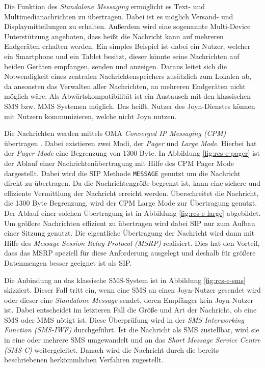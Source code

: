 \documentclass[german,12pt,a4paper]{article}
\begin{document}
    Die Funktion des \textit{Standalone Messaging} ermöglicht es Text- und Multimedianachrichten
    zu übertragen. Dabei ist es möglich Versand- und Displaymitteilungen zu erhalten. Außerdem wird
    eine sogenannte Multi-Device Unterstützung angeboten, dass heißt die Nachricht kann auf
    mehreren Endgeräten erhalten werden. Ein simples Beispiel ist dabei ein Nutzer, welcher ein
    Smartphone und ein Tablet besitzt, dieser könnte seine Nachrichten auf beiden Geräten
    empfangen, senden und anzeigen. Daraus leitet sich die Notwendigkeit eines zentralen
    Nachrichtenspeichers zusätzlich zum Lokalen ab, da ansonsten das Verwalten aller
    Nachrichten, an mehreren Endgeräten nicht möglich wäre. Als Abwärtskompatibilität ist
    ein Austausch mit den klassischen SMS bzw. MMS Systemen möglich. Das heißt, Nutzer des
    Joyn-Dienstes können mit Nutzern kommunizieren, welche nicht Joyn nutzen.

    Die Nachrichten werden mittels OMA \textit{Converged IP Messaging (CPM)} übertragen
    \cite{rcs:spec,rcs:cpm,oma:cpm}. Dabei existieren zwei Modi, der \textit{Pager} und
    \textit{Large Mode}. Hierbei hat der \textit{Pager Mode} eine Begrenzung von 1300 Byte. In
    Abbildung \ref{fig:rcs-e-pager} ist der Ablauf einer Nachrichtenübertragung mit Hilfe des CPM
    Pager Mode dargestellt. Dabei wird die SIP Methode \texttt{MESSAGE} genutzt um die Nachricht
    direkt zu übertragen. Da die Nachrichtengröße begrenzt ist, kann eine sichere und effiziente
    Vermittlung der Nachricht erreicht werden. Überschreitet die Nachricht, die 1300 Byte
    Begrenzung, wird der CPM Large Mode zur Übertragung genutzt. Der Ablauf einer solchen
    Übertragung ist in Abbildung \ref{fig:rcs-e-large} abgebildet. Um größere Nachrichten effizient
    zu übertragen wird dabei SIP nur zum Aufbau einer Sitzung genutzt. Die eigentliche Übertragung
    der Nachricht wird dann mit Hilfe des \textit{Message Session Relay Protocol (MSRP)} realisiert.
    Dies hat den Vorteil, dass das MSRP speziell für diese Anforderung ausgelegt und deshalb für
    größere Datenmengen besser geeignet ist als SIP.

    Die Anbindung an das klassische SMS-System ist in Abbildung \ref{fig:rcs-e-sms} skizziert.
    Dieser Fall tritt ein, wenn eine SMS an einen Joyn-Nutzer gesendet wird oder dieser eine
    \textit{Standalone Message} sendet, deren Empfänger kein  Joyn-Nutzer ist. Dabei
    entscheidet im letzteren Fall die Größe und Art der Nachricht, ob eine SMS oder MMS nötigt
    ist. Diese Überprüfung wird in der \textit{SMS Interworking Function (SMS-IWF)} durchgeführt.
    Ist die Nachricht als SMS zustellbar, wird sie in eine oder mehrere SMS umgewandelt und an das
    \textit{Short Message Service Centre (SMS-C)} weitergeleitet. Danach wird die Nachricht durch
    die bereits beschriebenen herkömmlichen Verfahren zugestellt.
\end{document}
